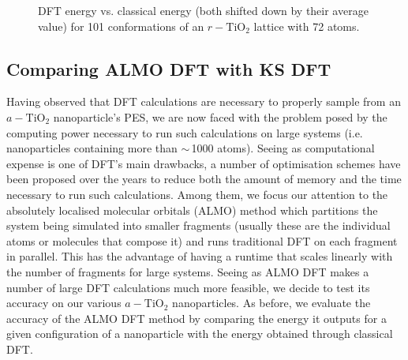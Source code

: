 \documentclass[aps,prb,twocolumn,amsmath,amssymb,superscriptaddress,longbibliography]{revtex4-1}
\newcommand\tab[1][1cm]{\hspace*{#1}} %
\begin{document}
\begin{figure}[htb]
\caption{DFT energy vs. classical energy (both shifted down by their average value) for 101 conformations of an $r-\text{TiO}_2$ lattice with 72 atoms.}
\label{rutile72}
\end{figure}

\subsection{Comparing ALMO DFT with KS DFT}

\tab Having observed that DFT calculations are necessary to properly sample from an $a-\text{TiO}_2$ nanoparticle's PES, we are now faced with the problem posed by the computing power necessary to run such calculations on large systems (i.e. nanoparticles containing more than $\sim\,$1000 atoms).
Seeing as computational expense is one of DFT's main drawbacks, a number of optimisation schemes have been proposed over the years to reduce both the amount of memory and the time necessary to run such calculations.
Among them, we focus our attention to the absolutely localised molecular orbitals (ALMO) method which partitions the system being simulated into smaller fragments (usually these are the individual atoms or molecules that compose it) and runs traditional DFT on each fragment in parallel.
This has the advantage of having a runtime that scales linearly with the number of fragments for large systems.
Seeing as ALMO DFT makes a number of large DFT calculations much more feasible, we decide to test its accuracy on our various $a-\text{TiO}_2$ nanoparticles.
As before, we evaluate the accuracy of the ALMO DFT method by comparing the energy it outputs for a given configuration of a nanoparticle with the energy obtained through classical DFT.  
\end{document}
